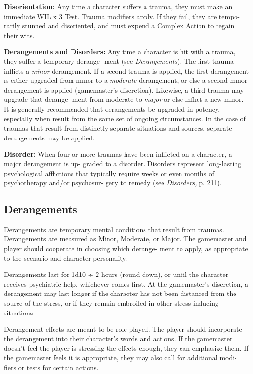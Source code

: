 \textbf{Disorientation:} Any time a character suffers a 
trauma, they must make an immediate WIL x 3 Test. 
Trauma modifiers apply. If they fail, they are tempo-
rarily stunned and disoriented, and must expend a 
Complex Action to regain their wits.

\textbf{Derangements and Disorders:} Any time a character 
is hit with a trauma, they suffer a temporary derange-
ment (see \textit{Derangements}). The first trauma inflicts a 
\textit{minor} derangement. If a second trauma is applied, 
the first derangement is either upgraded from minor 
to a \textit{moderate }derangement, or else a second minor 
derangement is applied (gamemaster's discretion). 
Likewise, a third trauma may upgrade that derange-
ment from moderate to \textit{major} or else inflict a new 
minor. It is generally recommended that derangements 
be upgraded in potency, especially when result from 
the same set of ongoing circumstances. In the case of 
traumas that result from distinctly separate situations 
and sources, separate derangements may be applied.

\textbf{Disorder:} When four or more traumas have been 
inflicted on a character, a major derangement is up-
graded to a disorder. Disorders represent long-lasting 
psychological afflictions that typically require weeks 
or even months of psychotherapy and/or psychosur-
gery to remedy (see \textit{Disorders,} p. 211).

\subsection{Derangements}

Derangements are temporary mental conditions that 
result from traumas. Derangements are measured as 
Minor, Moderate, or Major. The gamemaster and 
player should cooperate in choosing which derange-
ment to apply, as appropriate to the scenario and 
character personality.

Derangements last for 1d10 ÷ 2 hours (round 
down), or until the character receives psychiatric help, 
whichever comes first. At the gamemaster's discretion, 
a derangement may last longer if the character has not 
been distanced from the source of the stress, or if they 
remain embroiled in other stress-inducing situations.

Derangement effects are meant to be role-played. 
The player should incorporate the derangement into 
their character's words and actions. If the gamemaster 
doesn't feel the player is stressing the effects enough, 
they can emphasize them. If the gamemaster feels it is 
appropriate, they may also call for additional modi-
fiers or tests for certain actions.

